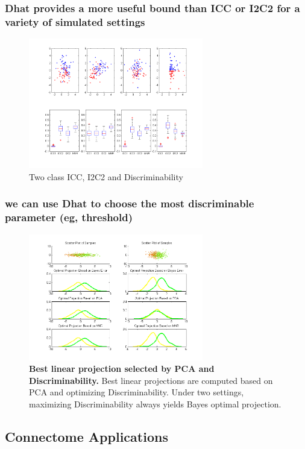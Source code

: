 \documentclass{article}
\begin{document}
\subsubsection{Dhat provides a more useful bound than ICC or I2C2 for a variety of simulated settings}

\begin{figure}[t!]
\includegraphics[width=3.0in]{../Figs/Figure1_draft.png}
\caption{Two class ICC, I2C2 and Discriminability}
\label{fig:2}
\end{figure}



\subsubsection{we can use Dhat to choose the most discriminable parameter (eg, threshold)}


\begin{figure}[t!]
\includegraphics[width=3.0in]{../Figs/parameter_selection_2sub.png}
\caption{{\bf Best linear projection selected by PCA and Discriminability.} Best linear projections are computed based on PCA and optimizing Discriminability. Under two settings, maximizing Discriminability always yields Bayes optimal projection. }
\label{fig:3}
\end{figure}




\subsection{Connectome Applications}
\end{document}
